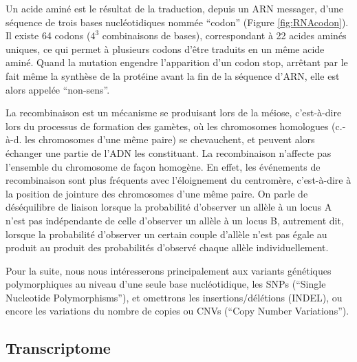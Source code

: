 \documentclass[11pt,a4paper,notrimn]{krantz}
\theoremstyle{definition}
\theoremstyle{definition}
\theoremstyle{remark}
\begin{document}
Un acide aminé est le résultat de la traduction, depuis un ARN messager,
d'une séquence de trois bases nucléotidiques nommée ``codon'' (Figure
\ref{fig:RNAcodon}). Il existe 64 codons (\(4^3\) combinaisons de
bases), correspondant à 22 acides aminés uniques, ce qui permet à
plusieurs codons d'être traduits en un même acide aminé. Quand la
mutation engendre l'apparition d'un codon stop, arrêtant par le fait
même la synthèse de la protéine avant la fin de la séquence d'ARN, elle
est alors appelée ``non-sens''.

La recombinaison est un mécanisme se produisant lors de la méiose,
c'est-à-dire lors du processus de formation des gamètes, où les
chromosomes homologues (c.-à-d. les chromosomes d'une même paire) se
chevauchent, et peuvent alors échanger une partie de l'ADN les
constituant. La recombinaison n'affecte pas l'ensemble du chromosome de
façon homogène. En effet, les événements de recombinaison sont plus
fréquents avec l'éloignement du centromère, c'est-à-dire à la position
de jointure des chromosomes d'une même paire. On parle de déséquilibre
de liaison lorsque la probabilité d'observer un allèle à un locus A
n'est pas indépendante de celle d'observer un allèle à un locus B,
autrement dit, lorsque la probabilité d'observer un certain couple
d'allèle n'est pas égale au produit au produit des probabilités
d'observé chaque allèle individuellement.

Pour la suite, nous nous intéresserons principalement aux variants
génétiques polymorphiques au niveau d'une seule base nucléotidique, les
SNPs (``Single Nucleotide Polymorphisms''), et omettrons les
insertions/délétions (INDEL), ou encore les variations du nombre de
copies ou CNVs (``Copy Number Variations'').

\subsection{Transcriptome}\label{transcriptome}
\end{document}
